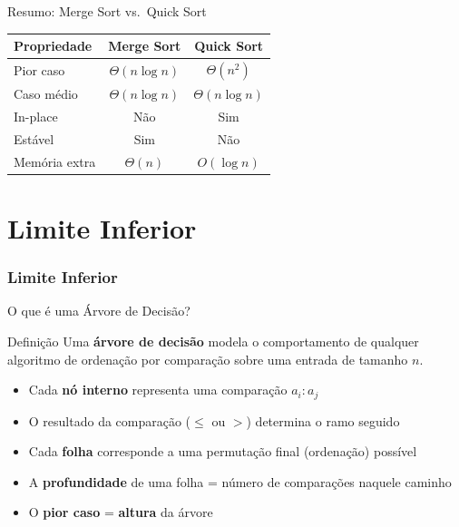\documentclass[aspectratio=169]{beamer}
\begin{document}
\begin{frame}{Resumo: Merge Sort vs.\ Quick Sort}
  \centering
  \renewcommand{\arraystretch}{1.4}
  \begin{tabular}{lcc}
    \hline
    \textbf{Propriedade} & \textbf{Merge Sort} & \textbf{Quick Sort} \\
    \hline
    Pior caso     & $\Theta(n \log n)$ & $\Theta(n^2)$ \\
    Caso médio    & $\Theta(n \log n)$ & $\Theta(n \log n)$ \\
    In-place      & Não & Sim \\
    Estável       & Sim & Não \\
    Memória extra & $\Theta(n)$ & $O(\log n)$ \\
    \hline
  \end{tabular}
\end{frame}

\part{Limite Inferior}
\section{Limite Inferior}

\begin{frame}{O que é uma Árvore de Decisão?}
  \begin{block}{Definição}
    Uma \textbf{árvore de decisão} modela o comportamento de qualquer algoritmo de
    ordenação por comparação sobre uma entrada de tamanho $n$.
  \end{block}

  \medskip
  \begin{itemize}
    \item Cada \textbf{nó interno} representa uma comparação $a_i : a_j$
    \item O resultado da comparação ($\leq$ ou $>$) determina o ramo seguido
    \item Cada \textbf{folha} corresponde a uma permutação final (ordenação) possível
    \item A \textbf{profundidade} de uma folha = número de comparações naquele caminho
    \item O \textbf{pior caso} = \textbf{altura} da árvore
  \end{itemize}
\end{frame}
\end{document}

